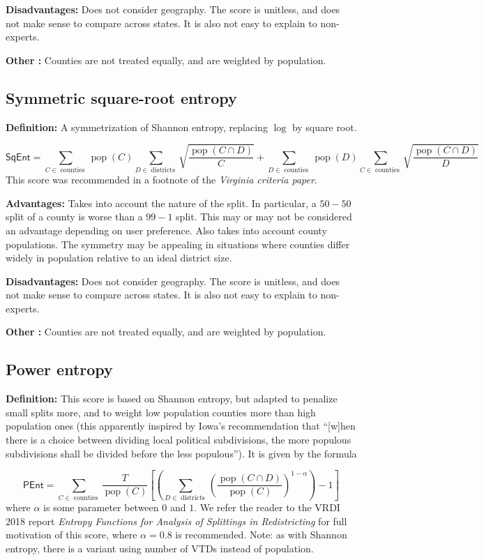 \documentclass{mgggarticle}
\DeclareMathOperator{\pop}{pop}
\DeclareMathOperator{\dis}{districts}
\DeclareMathOperator{\cou}{counties}
\begin{document}
\textbf{Disadvantages: } Does not consider geography. The score is unitless, and does not make sense to compare across states. It is also not easy to explain to non-experts.

\textbf{Other : } Counties are not treated equally, and are weighted by population.

\subsection{Symmetric square-root entropy}
\textbf{Definition: } A symmetrization of Shannon entropy, replacing $\log$ by square root.

$$
\textsf{SqEnt} = \sum_{C \in \cou} \pop(C) \sum_{D \in \dis} \sqrt{\frac{\pop(C \cap D)}{C}} + 
\sum_{D \in \cou} \pop(D) \sum_{C \in \cou} \sqrt{\frac{\pop(C \cap D)}{D}}
$$
This score was recommended in a footnote of the \emph{Virginia criteria paper}.

\textbf{Advantages: } Takes into account the nature of the split. In particular, a $50-50$ split of a county is worse than a $99-1$ split. This may or may not be considered an advantage depending on user preference. Also takes into account county populations. The symmetry may be appealing in situations where counties differ widely in population relative to an ideal district size.

\textbf{Disadvantages: } Does not consider geography. The score is unitless, and does not make sense to compare across states. It is also not easy to explain to non-experts.

\textbf{Other : } Counties are not treated equally, and are weighted by population.

\subsection{Power entropy}
\textbf{Definition: } This score is based on Shannon entropy, but adapted to penalize small splits more, and to weight low population counties more than high population ones (this apparently inspired by Iowa's recommendation that ``[w]hen there is a choice between dividing local political subdivisions, the more populous subdivisions shall be divided before the less populous''). It is given by the formula

$$
\textsf{PEnt} = \sum_{C \in \cou} \frac{T}{\pop(C)} \left[ \left( \sum_{D \in \dis} \left( \frac{\pop(C \cap D)}{\pop(C)} \right)^{1-\alpha} \right) - 1 \right]
$$
where $\alpha$ is some parameter between $0$ and $1$. We refer the reader to the VRDI 2018 report \emph{Entropy Functions for Analysis of Splittings in Redistricting} for full motivation of this score, where $\alpha = 0.8$ is recommended. Note: as with Shannon entropy, there is a variant using number of VTDs instead of population.
\end{document}

